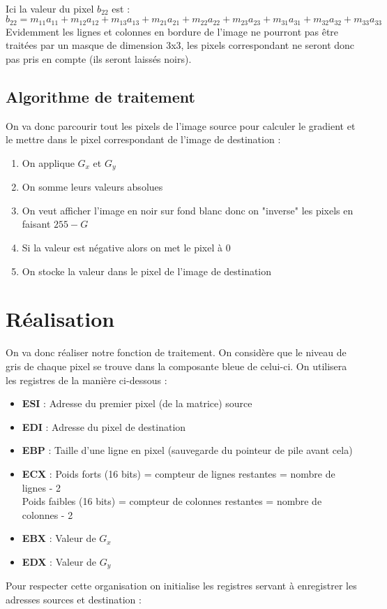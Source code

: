 \\
Ici la valeur du pixel $b_{22}$ est :
\begin{equation}
b_{22} = m_{11}a_{11} + m_{12}a_{12} + m_{13}a_{13} + m_{21}a_{21} + m_{22}a_{22} + m_{23}a_{23} + m_{31}a_{31} + m_{32}a_{32} + m_{33}a_{33}     
\end{equation}
Evidemment les lignes et colonnes en bordure de l'image ne pourront pas être traitées par un masque de dimension 3x3, les pixels correspondant ne seront donc pas pris en compte (ils seront laissés noirs).

\subsection{Algorithme de traitement}
On va donc parcourir tout les pixels de l'image source pour calculer le gradient et le mettre dans le pixel correspondant de l'image de destination :
\begin{enumerate}
\item On applique $G_x$ et $G_y$
\item On somme leurs valeurs absolues
\item On veut afficher l'image en noir sur fond blanc donc on "inverse" les pixels en faisant $255-G$
\item Si la valeur est négative alors on met le pixel à 0
\item On stocke la valeur dans le pixel de l'image de destination
\end{enumerate}

\section{Réalisation}
On va donc réaliser notre fonction de traitement. On considère que le niveau de gris de chaque pixel se trouve dans la composante bleue de celui-ci. On utilisera les registres de la manière ci-dessous :
\begin{itemize}
    \item \textbf{ESI} : Adresse du premier pixel (de la matrice) source
    \item \textbf{EDI} : Adresse du pixel de destination
    \item \textbf{EBP} : Taille d'une ligne en pixel (sauvegarde du pointeur de pile avant cela)
    \item \textbf{ECX} : Poids forts (16 bits) = compteur de lignes restantes = nombre de lignes - 2\\Poids faibles (16 bits) = compteur de colonnes restantes = nombre de colonnes - 2
    \item \textbf{EBX} : Valeur de $G_x$
    \item \textbf{EDX} : Valeur de $G_y$
\end{itemize}
Pour respecter cette organisation on initialise les registres servant à enregistrer les adresses sources et destination :

